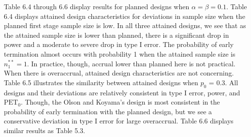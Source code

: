 \documentclass[12pt]{report}\usepackage[]{graphicx}\usepackage[]{color}
\newlength{\li}\setlength{\li}{14.48pt}
\newlength{\di}\setlength{\di}{-3.5mm}
\begin{document}
\indent Table 6.4 through 6.6 display results for planned designs when $\alpha = \beta = 0.1$. Table 6.4 displays attained design characteristics for deviations in sample size when the planned first stage sample size is low. In all three attained designs, we see that as the attained sample size is lower than planned, there is a significant drop in power and a moderate to severe drop in type I error. The probability of early termination almost occurs with probability 1 when the attained sample size is $n_1^{\ast\ast} = 1$. In practice, though, accrual lower than planned here is not practical. When there is overaccrual, attained design characteristics are not concerning. \\
\indent Table 6.5 illustrates the similarity between attained designs when $p_0$ = 0.3. All designs and their deviations are relatively consistent in type I error, power, and $\mbox{PET}_0$. Though, the Olson and Koyama's design is most consistent in the probability of early termination with the planned design, but we see a conservative deviation in type I error for large overaccrual. Table 6.6 displays similar results as Table 5.3. \\
\end{document}
